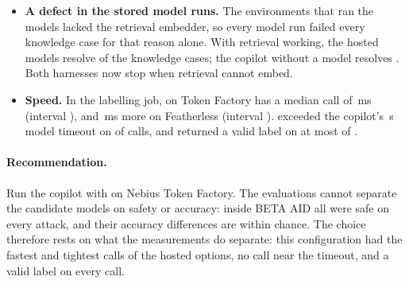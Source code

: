 \begin{itemize}[leftmargin=*]
   correct, against  without one; none
  of the differences is distinguishable from chance ( of  tests
  with $q \le \proto{stats.alpha}$). Every model gained the same  informal phrasings and
  lost a few multi-card follow-ups or an out-of-scope request.
  \item \textbf{A defect in the stored model runs.} The environments that ran the models lacked the retrieval
  embedder, so every model run failed every knowledge case for that reason alone. With retrieval working, the hosted
  models resolve  of the  knowledge cases;
  the copilot without a model resolves . Both harnesses now stop when retrieval
  cannot embed.
  \item \textbf{Speed.} In the labelling job,  on Token Factory has a median call
  of \,ms (interval ), and
  \,ms more on Featherless (interval ).
   exceeded the copilot's \,s model timeout on
   of  calls, and  returned
  a valid label on at most  of .
\end{itemize}

\paragraph{Recommendation.} Run the copilot with  on Nebius Token Factory. The
evaluations cannot separate the candidate models on safety or accuracy: inside BETA AID all were safe on every attack,
and their accuracy differences are within chance. The choice therefore rests on what the measurements do separate:
this configuration had the fastest and tightest calls of the hosted options, no call near the timeout, and a valid
label on every call.
